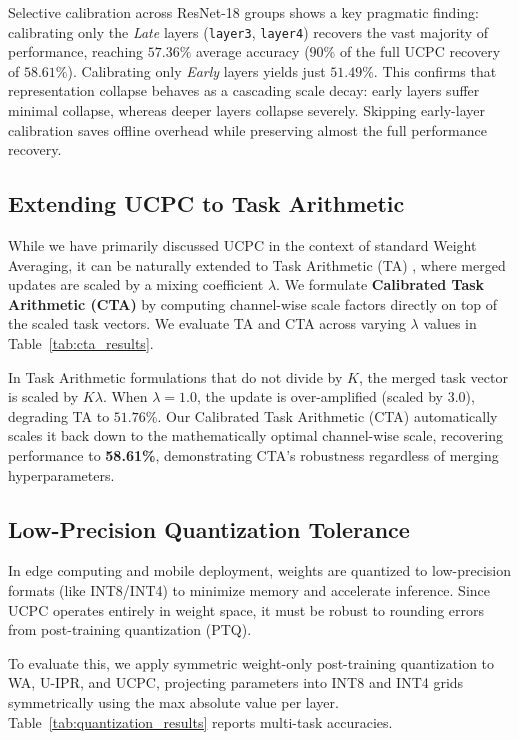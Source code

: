 \documentclass{article}
\theoremstyle{plain}
\theoremstyle{definition}
\theoremstyle{remark}
\begin{document}
Selective calibration across ResNet-18 groups shows a key pragmatic finding: calibrating only the \textit{Late} layers (\texttt{layer3}, \texttt{layer4}) recovers the vast majority of performance, reaching $57.36\%$ average accuracy ($90\%$ of the full UCPC recovery of $58.61\%$). Calibrating only \textit{Early} layers yields just $51.49\%$. This confirms that representation collapse behaves as a cascading scale decay: early layers suffer minimal collapse, whereas deeper layers collapse severely. Skipping early-layer calibration saves offline overhead while preserving almost the full performance recovery.

\subsection{Extending UCPC to Task Arithmetic}
While we have primarily discussed UCPC in the context of standard Weight Averaging, it can be naturally extended to Task Arithmetic (TA) \cite{ilharco23}, where merged updates are scaled by a mixing coefficient $\lambda$. We formulate \textbf{Calibrated Task Arithmetic (CTA)} by computing channel-wise scale factors directly on top of the scaled task vectors. We evaluate TA and CTA across varying $\lambda$ values in Table~\ref{tab:cta_results}.

In Task Arithmetic formulations that do not divide by $K$, the merged task vector is scaled by $K \lambda$. When $\lambda=1.0$, the update is over-amplified (scaled by $3.0$), degrading TA to $51.76\%$. Our Calibrated Task Arithmetic (CTA) automatically scales it back down to the mathematically optimal channel-wise scale, recovering performance to \textbf{58.61\%}, demonstrating CTA's robustness regardless of merging hyperparameters.

\subsection{Low-Precision Quantization Tolerance}
In edge computing and mobile deployment, weights are quantized to low-precision formats (like INT8/INT4) to minimize memory and accelerate inference. Since UCPC operates entirely in weight space, it must be robust to rounding errors from post-training quantization (PTQ).

To evaluate this, we apply symmetric weight-only post-training quantization to WA, U-IPR, and UCPC, projecting parameters into INT8 and INT4 grids symmetrically using the max absolute value per layer. Table~\ref{tab:quantization_results} reports multi-task accuracies.
\end{document}
